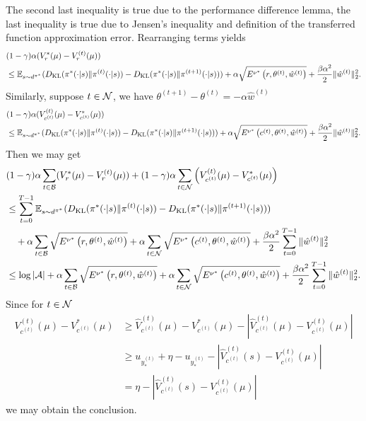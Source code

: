 The second last inequality is true due to the performance difference lemma, the last inequality is true due to Jensen's inequality and definition of the transferred function approximation error.
Rearranging terms yields
$$
\begin{aligned}
&(1-\gamma)\alpha(V_r^*(\mu)-V_r^{(t)}(\mu))\\
&\leq {\mathbb E}_{s\sim d^{\pi^*}}(D_{\operatorname{KL}}(\pi^*(\cdot|s)\|\pi^{(t)}(\cdot|s))-D_{\operatorname{KL}}(\pi^*(\cdot|s)\|\pi^{(t+1)}(\cdot|s)))+\alpha\sqrt{E^{\nu^*}\left(r, \theta^{(t)},\hat w^{(t)}\right)}
+\frac{\beta\alpha^2}{2}\|\hat w^{(t)}\|^2_2.
\end{aligned}
$$
Similarly, suppose $t\in{\mathcal{N}}$, we have $\theta^{(t+1)}-\theta^{(t)}=-\alpha\hat w^{(t)}$
$$
\begin{aligned}
&(1-\gamma)\alpha(V_{c^{(t)}}^{(t)}(\mu)-V_{c^{(t)}}^*(\mu))\\
&\leq {\mathbb E}_{s\sim d^{\pi^*}}(D_{\operatorname{KL}}(\pi^*(\cdot|s)\|\pi^{(t)}(\cdot|s))-D_{\operatorname{KL}}(\pi^*(\cdot|s)\|\pi^{(t+1)}(\cdot|s)))+\alpha\sqrt{E^{\nu^*}\left(c^{(t)}, \theta^{(t)},\hat w^{(t)}\right)}
+\frac{\beta\alpha^2}{2}\|\hat w^{(t)}\|^2_2.
\end{aligned}
$$
Then we may get
$$
\begin{aligned}
&(1-\gamma)\alpha\sum_{t\in {\mathcal{B}}} (V_r^*(\mu)-V_r^{(t)}(\mu))+(1-\gamma)\alpha\sum_{t\in {\mathcal{N}}}\left(V_{c^{(t)}}^{(t)}(\mu)-V_{c^{(t)}}^*(\mu)\right)\\
&\leq \sum_{t=0}^{T-1} {\mathbb E}_{s\sim d^{\pi^*}}(D_{\operatorname{KL}}(\pi^*(\cdot|s)\|\pi^{(t)}(\cdot|s))-D_{\operatorname{KL}}(\pi^*(\cdot|s)\|\pi^{(t+1)}(\cdot|s)))\\
&\quad+\alpha\sum_{t\in{\mathcal{B}}}\sqrt{E^{\nu^*}\left(r, \theta^{(t)},\hat w^{(t)}\right)}+\alpha\sum_{t\in{\mathcal{N}}}\sqrt{E^{\nu^*}\left(c^{(t)}, \theta^{(t)},\hat w^{(t)}\right)}+\frac{\beta\alpha^2}{2}\sum_{t=0}^{T-1}\|\hat w^{(t)}\|_2^2\\
&\leq \log|{\mathcal{A}}|+\alpha\sum_{t\in{\mathcal{B}}}\sqrt{E^{\nu^*}\left(r, \theta^{(t)},\hat w^{(t)}\right)}+\alpha\sum_{t\in{\mathcal{N}}}\sqrt{E^{\nu^*}\left(c^{(t)}, \theta^{(t)},\hat w^{(t)}\right)}+\frac{\beta\alpha^2}{2}\sum_{t=0}^{T-1}\|\hat w^{(t)}\|_2^2.
\end{aligned}
$$
Since for $t\in{\mathcal{N}}$
$$
\begin{aligned}
V_{c^{(t)}}^{(t)}(\mu)-V_{c^{(t)}}^*(\mu)&\geq \widehat V_{c^{(t)}}^{(t)}(\mu)-V_{c^{(t)}}^*(\mu)-\left|\widehat V_{c^{(t)}}^{(t)}(\mu)-V_{c^{(t)}}^{(t)}(\mu)\right|\\
&\geq u_{y_*^{(t)}}+\eta-u_{y_*^{(t)}}-\left|\widehat V_{c^{(t)}}^{(t)}(s)-V_{c^{(t)}}^{(t)}(\mu)\right|\\
&=\eta-\left|\widehat V_{c^{(t)}}^{(t)}(s)-V_{c^{(t)}}^{(t)}(\mu)\right|
\end{aligned}
$$
we may obtain the conclusion.
\endproof

